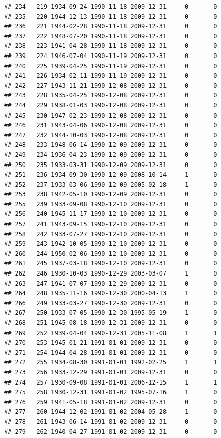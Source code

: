\documentclass[
]{book}
\theoremstyle{definition}
\theoremstyle{definition}
\theoremstyle{definition}
\theoremstyle{definition}
\theoremstyle{remark}
\begin{document}
\begin{verbatim}
## 234   219 1934-09-24 1990-11-18 2009-12-31     0       0
## 235   220 1944-12-13 1990-11-18 2009-12-31     0       0
## 236   221 1944-02-28 1990-11-18 2009-12-31     0       0
## 237   222 1948-07-20 1990-11-18 2009-12-31     0       0
## 238   223 1941-04-28 1990-11-18 2009-12-31     0       0
## 239   224 1946-07-04 1990-11-19 2009-12-31     0       0
## 240   225 1939-04-25 1990-11-19 2009-12-31     0       0
## 241   226 1934-02-11 1990-11-19 2009-12-31     0       0
## 242   227 1943-11-21 1990-12-08 2009-12-31     0       0
## 243   228 1935-04-25 1990-12-08 2009-12-31     0       0
## 244   229 1938-01-03 1990-12-08 2009-12-31     0       0
## 245   230 1947-02-23 1990-12-08 2009-12-31     0       0
## 246   231 1943-04-06 1990-12-08 2009-12-31     0       0
## 247   232 1944-10-03 1990-12-08 2009-12-31     0       0
## 248   233 1948-06-14 1990-12-09 2009-12-31     0       0
## 249   234 1936-04-23 1990-12-09 2009-12-31     0       0
## 250   235 1933-03-31 1990-12-09 2009-12-31     0       0
## 251   236 1934-09-30 1990-12-09 2008-10-14     1       0
## 252   237 1933-03-06 1990-12-09 2005-02-18     1       0
## 253   238 1942-05-10 1990-12-09 2009-12-31     0       0
## 255   239 1933-09-08 1990-12-10 2009-12-31     0       0
## 256   240 1945-11-17 1990-12-10 2009-12-31     0       0
## 257   241 1943-09-15 1990-12-10 2009-12-31     0       0
## 258   242 1933-07-27 1990-12-10 2009-12-31     0       0
## 259   243 1942-10-05 1990-12-10 2009-12-31     0       0
## 260   244 1950-02-06 1990-12-10 2009-12-31     0       0
## 261   245 1937-03-18 1990-12-10 2009-12-31     0       0
## 262   246 1930-10-03 1990-12-29 2003-03-07     1       0
## 263   247 1941-07-07 1990-12-29 2009-12-31     0       0
## 264   248 1935-11-16 1990-12-30 2000-04-13     1       0
## 266   249 1933-03-27 1990-12-30 2009-12-31     0       0
## 267   250 1933-07-05 1990-12-30 1995-05-19     1       0
## 268   251 1945-08-18 1990-12-31 2009-12-31     0       0
## 269   252 1939-04-04 1990-12-31 2005-11-08     1       1
## 270   253 1945-01-21 1991-01-01 2009-12-31     0       0
## 271   254 1944-04-28 1991-01-01 2009-12-31     0       0
## 272   255 1934-08-30 1991-01-01 1992-02-25     1       1
## 273   256 1933-12-29 1991-01-01 2009-12-31     0       0
## 274   257 1930-09-08 1991-01-01 2006-12-15     1       1
## 275   258 1930-12-31 1991-01-02 1995-07-16     1       0
## 276   259 1941-05-18 1991-01-02 2009-12-31     0       0
## 277   260 1944-12-02 1991-01-02 2004-05-28     1       0
## 278   261 1943-06-14 1991-01-02 2009-12-31     0       0
## 279   262 1940-04-27 1991-01-02 2009-12-31     0       0

\end{verbatim}
\end{document}

